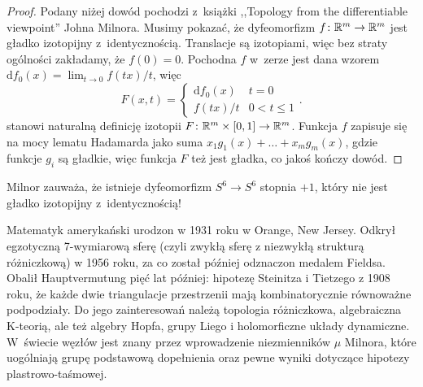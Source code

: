 \begin{proof}
    Podany niżej dowód pochodzi z~książki ,,Topology from the differentiable viewpoint'' Johna Milnora.
%
    Musimy pokazać, że dyfeomorfizm $f \colon \mathbb R^m \to \mathbb R^m$ jest gładko izotopijny z~identycznością.
    Translacje są izotopiami, więc bez straty ogólności zakładamy, że $f(0) = 0$.
    Pochodna $f$ w~zerze jest dana wzorem $\mathrm{d}f_0(x) = \lim_{t \to 0} f(tx) /t$, więc
    \begin{equation}
        F(x, t) = \begin{cases}
            \mathrm{d}f_0(x) & t = 0 \\
            f(tx) / t & 0 < t \le 1
        \end{cases} .
    \end{equation}
    stanowi naturalną definicję izotopii $F \colon \mathbb R^m \times [0, 1] \to \mathbb R^m$.
    Funkcja $f$ zapisuje się na mocy lematu Hadamarda jako suma $x_1 g_1(x) + \ldots + x_mg_m(x)$, gdzie funkcje $g_i$ są gładkie, więc funkcja $F$ też jest gładka, co jakoś kończy dowód.
%    
\end{proof}

Milnor zauważa, że istnieje dyfeomorfizm $S^6 \to S^6$ stopnia $+1$, który nie jest gładko izotopijny z~identycznością!
%

\begin{remark}
    Matematyk amerykański urodzon w 1931 roku w Orange, New Jersey.
    Odkrył egzotyczną 7-wymiarową sferę (czyli zwykłą sferę z niezwykłą strukturą różniczkową) w 1956 roku, za co został później odznaczon medalem Fieldsa.
    Obalił Hauptvermutung pięć lat później: hipotezę Steinitza i Tietzego z 1908 roku, że każde dwie triangulacje przestrzenii mają kombinatorycznie równoważne podpodziały.
    Do jego zainteresowań należą topologia różniczkowa, algebraiczna K-teorią, ale też algebry Hopfa, grupy Liego i holomorficzne układy dynamiczne.
    W~świecie węzłów jest znany przez wprowadzenie niezmienników $\mu$ Milnora, które uogólniają grupę podstawową dopełnienia oraz pewne wyniki dotyczące hipotezy plastrowo-taśmowej.
\end{remark}
%
%
%
